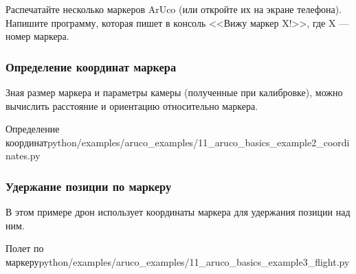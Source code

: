 \begin{taskbox}
Распечатайте несколько маркеров ArUco (или откройте их на экране телефона). Напишите программу, которая пишет в консоль <<Вижу маркер X!>>, где X — номер маркера.
\end{taskbox}

\subsubsection*{Определение координат маркера}
Зная размер маркера и параметры камеры (полученные при калибровке), можно вычислить расстояние и ориентацию относительно маркера.

\begin{codefiletitle}[python]{Определение координат}{python/examples/aruco_examples/11_aruco_basics_example2_coordinates.py}
\end{codefiletitle}

\subsubsection*{Удержание позиции по маркеру}
В этом примере дрон использует координаты маркера для удержания позиции над ним.

\begin{codefiletitle}[python]{Полет по маркеру}{python/examples/aruco_examples/11_aruco_basics_example3_flight.py}
\end{codefiletitle}
